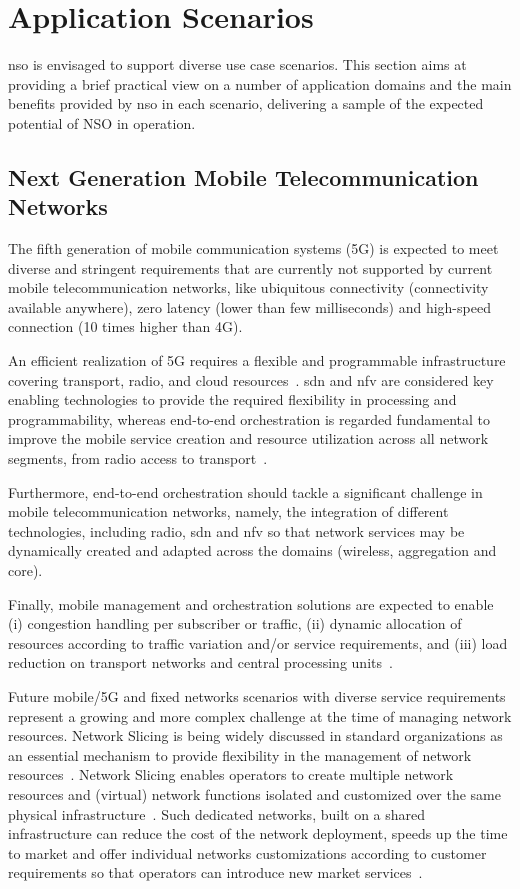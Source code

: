 \section{Application Scenarios}
\label{sec:scneario}

\gls{nso} is envisaged to support diverse use case scenarios. This section aims at providing a brief practical view on a number of application domains and the main benefits provided by \gls{nso} in each scenario, delivering a sample of the expected potential of NSO in operation. 

\subsection{Next Generation Mobile Telecommunication Networks}

The fifth generation of mobile communication systems (5G) is expected to meet diverse and stringent requirements that are currently not supported by current mobile telecommunication networks, like ubiquitous connectivity (connectivity available anywhere), zero latency (lower than few milliseconds) and high-speed connection (10 times higher than 4G).

An efficient realization of 5G requires a flexible and programmable infrastructure covering transport, radio, and cloud resources~\cite{NGMN:5G:2017}. \gls{sdn} and \gls{nfv} are considered key enabling technologies to provide the required flexibility in processing and programmability, whereas end-to-end orchestration is regarded fundamental to improve the mobile service creation and resource utilization across all network segments, from radio access to transport~\cite{rostami-ran-transport-17}.

Furthermore, end-to-end orchestration should tackle  a significant challenge in mobile telecommunication networks, namely, the integration of different technologies, including radio, \gls{sdn} and \gls{nfv} so that network services may be dynamically created and adapted across the domains (wireless, aggregation and core). 

Finally, mobile management and orchestration solutions are expected to enable (i) congestion handling per subscriber or traffic, (ii) dynamic allocation of resources according to traffic variation and/or service requirements, and (iii) load reduction on transport networks and central processing units~\cite{EricssonInc.2015}. 

Future mobile/5G and fixed networks scenarios with diverse service requirements represent a growing and more complex challenge at the time of managing network resources. Network Slicing is being widely discussed in standard organizations as an essential mechanism to provide flexibility in the management of network resources~\cite{NGMN:5G:2017}. Network Slicing enables operators to create multiple network resources and (virtual) network functions isolated and customized over the same physical infrastructure~\cite{Galis:2018}. Such dedicated networks, built on a shared infrastructure can reduce the cost of the network deployment, speeds up the time to market and offer individual networks customizations according to customer requirements so that operators can introduce new market services~\cite{Devlic2017NESMO:Framework}. 

